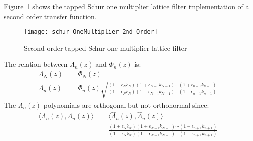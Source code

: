 \documentclass[a4paper,twoside,10pt,english]{article}
\begin{document}
Figure~\ref{fig:Second-order-tapped-Schur-one-multiplier-lattice-filter}
shows the tapped Schur one multiplier lattice filter implementation of a
second order transfer function.

\begin{figure}
\centering
\texttt{[image: schur\_OneMultiplier\_2nd\_Order]}
\caption{Second-order tapped Schur one-multiplier lattice filter}
\label{fig:Second-order-tapped-Schur-one-multiplier-lattice-filter}
\end{figure}

The relation between $\Lambda_{n}\left(z\right)$ and $\Phi_{n}\left(z\right)$ is:
\begin{align*}
\Lambda_{N}\left(z\right) & = \Phi_{N}\left(z\right)\\
  \Lambda_{n}\left(z\right)
  &= \Phi_{n}\left(z\right)\sqrt{\frac{\left(1+\epsilon_{N}k_{N}\right)
    \left(1+\epsilon_{N-1}k_{N-1}\right)\cdots
    \left(1+\epsilon_{n+1}k_{n+1}\right)}
    {\left(1-\epsilon_{N}k_{N}\right)
    \left(1-\epsilon_{N-1}k_{N-1}\right)\cdots
    \left(1-\epsilon_{n+1}k_{n+1}\right)}}
\end{align*}
The $\Lambda_{n}\left(z\right)$ polynomials are orthogonal but not orthonormal
since:
\begin{align*}
\langle \Lambda_{n}\left(z\right),\Lambda_{n}\left(z\right)\rangle
&= \langle\hat{\Lambda}_{n}\left(z\right),\hat{\Lambda}_{n}\left(z\right)\rangle\\
&=\frac{\left(1+\epsilon_{N}k_{N}\right)\left(1+\epsilon_{N-1}k_{N-1}\right)
  \cdots\left(1+\epsilon_{n+1}k_{n+1}\right)}
  {\left(1-\epsilon_{N}k_{N}\right)\left(1-\epsilon_{N-1}k_{N-1}\right)
  \cdots\left(1-\epsilon_{n+1}k_{n+1}\right)}
\end{align*}
\end{document}
